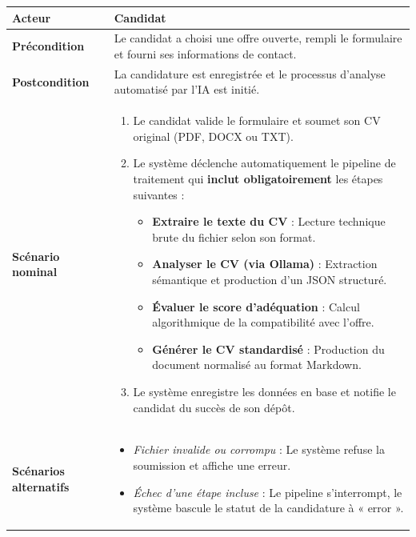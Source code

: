 \documentclass[12pt,a4paper,oneside]{report}
\begin{document}
\begin{itemize}
\begin{table}[H]
\begin{tabular}{|p{3.5cm}|p{11cm}|}
\hline
\textbf{Acteur} & Candidat \\
\hline
\textbf{Précondition} & Le candidat a choisi une offre ouverte, rempli le formulaire et fourni ses informations de contact. \\
\hline
\textbf{Postcondition} & La candidature est enregistrée et le processus d'analyse automatisé par l'IA est initié. \\
\hline
\textbf{Scénario nominal} &
\begin{minipage}[t]{10.5cm}
\begin{enumerate}
    \item Le candidat valide le formulaire et soumet son CV original (PDF, DOCX ou TXT).
    \item Le système déclenche automatiquement le pipeline de traitement qui \textbf{inclut obligatoirement} les étapes suivantes :
        \begin{itemize}
            \item \textbf{Extraire le texte du CV} : Lecture technique brute du fichier selon son format.
            \item \textbf{Analyser le CV (via Ollama)} : Extraction sémantique et production d'un JSON structuré.
            \item \textbf{Évaluer le score d'adéquation} : Calcul algorithmique de la compatibilité avec l'offre.
            \item \textbf{Générer le CV standardisé} : Production du document normalisé au format Markdown.
        \end{itemize}
    \item Le système enregistre les données en base et notifie le candidat du succès de son dépôt.
\end{enumerate}
\vspace{0.3cm}

\end{minipage} \\
\hline
\textbf{Scénarios alternatifs} &
\begin{minipage}[t]{10.5cm}
\begin{itemize}
    \item \textit{Fichier invalide ou corrompu} : Le système refuse la soumission et affiche une erreur.
    \item \textit{Échec d'une étape incluse} : Le pipeline s'interrompt, le système bascule le statut de la candidature à « error ».
\end{itemize}
\vspace{0.3cm}
\end{minipage} \\
\hline
\end{tabular}


\end{table}
\end{itemize}
\end{document}
